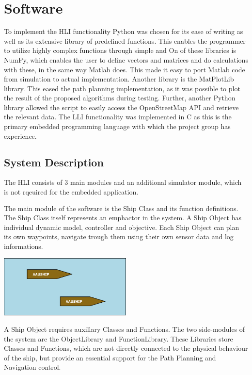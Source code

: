 \chapter{Software}

To implement the HLI functionality Python was chosen for its ease of writing as well as its extensive library of predefined functions. This enables the programmer to utilize highly complex functions through simple and  On of these libraries is NumPy, which enables the user to define vectors and matrices and do calculations with these, in the same way Matlab does. This made it easy to port Matlab code from simulation to actual implementation. Another library is the MatPlotLib library. This eased the path planning implementation, as it was possible to plot the result of the proposed algorithms during testing. Further, another Python library allowed the script to easily access the OpenStreetMap API and retrieve the relevant data.
The LLI functionality was implemented in C as this is the primary embedded programming language with which the project group has experience.

\section{System Description}

The HLI consists of 3 main modules and an additional simulator module, which is not rqeuired for the embedded application.

The main module of the software is the Ship Class and its function definitions.
The Ship Class itself represents an emph{actor} in the system. A Ship Object has individual dynamic model, controller and objective. Each Ship Object can plan its own waypoints, navigate trough them using their own sensor data and log informations.

\begin{center}
\includegraphics[width = 0.5\textwidth]{img/HLIFigures/ActorModel/Actor-model0.png}
\end{center}

A Ship Object requires auxillary Classes and Functions. The two side-modules of the system are the ObjectLibrary and FunctionLibrary. These Libraries store Classes and Functions, which are not directly connected to the physical behaviour of the ship, but provide an essential support for the Path Planning and Navigation control.

